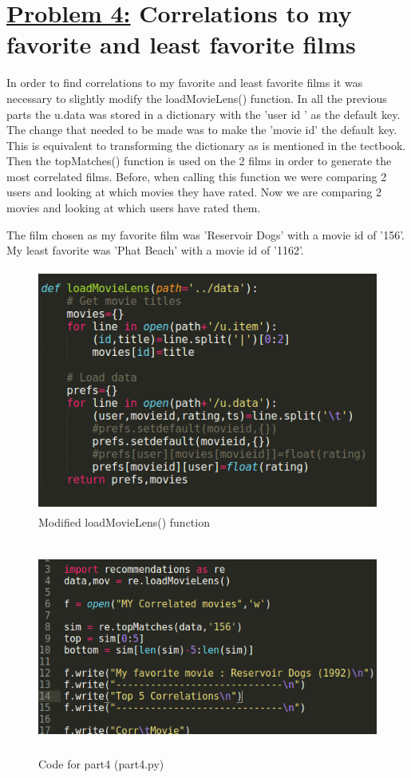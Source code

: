 \documentclass{article}
\begin{document}
\section*{{\underline{\huge {Problem 4:}} Correlations to my favorite and least favorite films}}
In order to find correlations to my favorite and least favorite films it was necessary to slightly modify the loadMovieLens() function. In all the previous parts the u.data was stored in a dictionary with the 'user id ' as the default key. The change that needed to be made was to make the 'movie id' the default key. This is equivalent to transforming the dictionary as is mentioned in the tectbook. Then the topMatches() function is used on the 2 films in order to generate the most correlated films. Before, when calling this function we were comparing 2 users and looking at which movies they have rated. Now we are comparing 2 movies and looking at which users have rated them.

The film chosen as my favorite film was 'Reservoir Dogs' with a movie id of '156'. My least favorite was 'Phat Beach' with a movie id of '1162'.

\begin{figure}[H]
 \centering
 	\includegraphics[height=8cm]{load.png}
  \caption{Modified loadMovieLens() function}
\end{figure}

\begin{figure}[H]
 \centering
 	\includegraphics[height=7cm]{part4.png}
  \caption{Code for part4 (part4.py)}
\end{figure}
\end{document}
